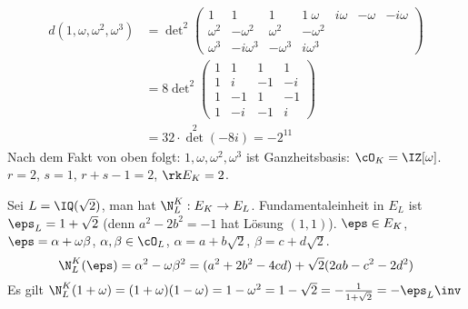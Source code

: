 \begin{Beweis}
\begin{align*}
 d(1,\omega,\omega^2,\omega^3)&=\det\nolimits^2\begin{pmatrix}
                                                1 & 1 & 1& 1\
                                                \omega & i\omega & -\omega & -i\omega\\
                                                \omega^2 & -\omega^2 & \omega^2 & -\omega^2\\
                                                \omega^3 & -i\omega^3 & -\omega^3 & i\omega^3
                                               \end{pmatrix}\\
                               &=8\det\nolimits^2\begin{pmatrix}
						  1& 1& 1& 1\\
						  1 & i & -1 & -i\\
						  1 & -1 & 1 & -1\\
						  1 & -i & -1 & i
                                                \end{pmatrix}\\
                               &=32 \cdot \det\limits^2(-8i)= -2^{11}
\end{align*}
Nach dem Fakt von oben folgt: $1,\omega,\omega^2,\omega^3$ ist Ganzheitsbasis: $\cO_K=\IZ[\omega]$. $r=2$, $s=1$, $r+s-1=2$, $\rk E_K=2$.

Sei $L=\IQ(\sqrt 2)$, man hat $\N_L^K: E_K\rightarrow E_L$. Fundamentaleinheit in $E_L$ ist $\eps_L=1+\sqrt{2}$ (denn $a^2-2b^2=-1$ hat Lösung $(1,1)$).
$\eps\in E_K$, $\eps=\alpha+\omega\beta$, $\alpha,\beta\in\cO_L$, $\alpha=a+b\sqrt{2}$, $\beta=c+d\sqrt{2}$.
\[\N_L^K(\eps)=\alpha^2-\omega\beta^2=(a^2+2b^2-4cd)+\sqrt{2}(2ab-c^2-2d^2) \]
Es gilt $\N_L^K(1+\omega)=(1+\omega)(1-\omega)=1-\omega^2=1-\sqrt 2=-\frac{1}{1+\sqrt 2}=-\eps_L\inv$

\end{Beweis}

